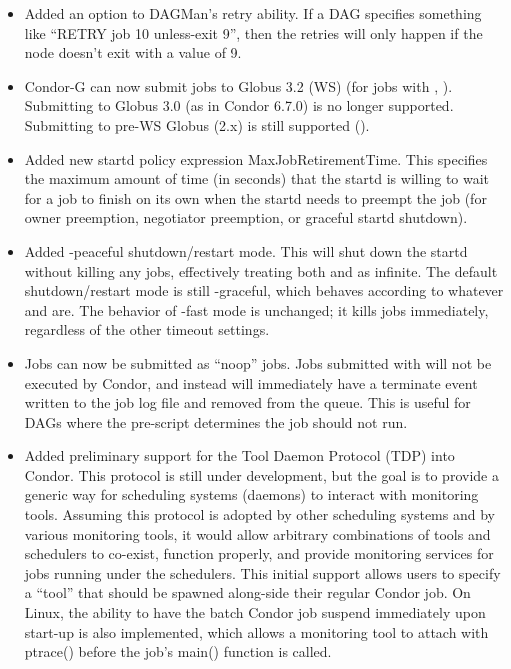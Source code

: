 \begin{itemize}

\item Added an option to DAGMan's retry ability. If a DAG specifies
  something like ``RETRY job 10 unless-exit 9'', then the retries will
  only happen if the node doesn't exit with a value of 9. 

\item Condor-G can now submit jobs to Globus 3.2 (WS) (for jobs with 
  , ). Submitting to Globus 
  3.0 (as in Condor 6.7.0) is no longer supported. Submitting to pre-WS 
  Globus (2.x) is still supported ().

\item Added new startd policy expression MaxJobRetirementTime.  This
specifies the maximum amount of time (in seconds) that the startd
is willing to wait for a job to finish on its own when the startd
needs to preempt the job (for owner preemption, negotiator preemption,
or graceful startd shutdown).

\item Added -peaceful shutdown/restart mode.  This will shut down the
startd without killing any jobs, effectively treating both
 and  as
infinite.  The default shutdown/restart mode is still -graceful, which
behaves according to whatever  and
 are.  The behavior of -fast mode
is unchanged; it kills jobs immediately, regardless of the other
timeout settings.

\item Jobs can now be submitted as ``noop'' jobs. Jobs submitted with
   will not be executed by Condor, and instead will
   immediately have a terminate event written to the job log file and 
   removed from the queue. This is useful for DAGs where the pre-script
   determines the job should not run.

\item Added preliminary support for the Tool Daemon Protocol (TDP)
  into Condor.
  This protocol is still under development, but the goal is to provide
  a generic way for scheduling systems (daemons) to interact with
  monitoring tools.
  Assuming this protocol is adopted by other scheduling systems and by
  various monitoring tools, it would allow arbitrary combinations of
  tools and schedulers to co-exist, function properly, and provide
  monitoring services for jobs running under the schedulers.
  This initial support allows users to specify a ``tool'' that should
  be spawned along-side their regular Condor job.
  On Linux, the ability to have the batch Condor job suspend
  immediately upon start-up is also implemented, which allows a
  monitoring tool to attach with ptrace() before the job's main()
  function is called.

\end{itemize}

